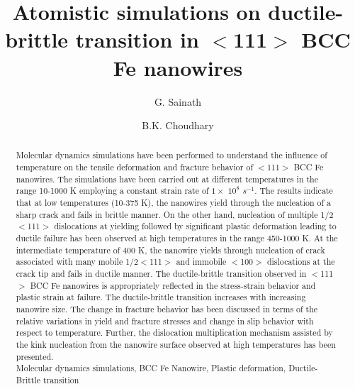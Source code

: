 \documentclass[%
reprint,%
 amssymb, amsmath,%
 aip,apl,%
]{revtex4-1}
\begin{document}
\title{ Atomistic simulations on ductile-brittle transition in  $<$111$>$ BCC Fe nanowires}

\author{G. Sainath}%

%

\author{B.K. Choudhary}




\begin{abstract}

Molecular dynamics simulations have been performed to understand the influence of temperature on the tensile deformation 
and fracture behavior of $<$111$>$ BCC Fe nanowires. The simulations have been carried out at different temperatures in 
the range 10-1000 K employing a constant strain rate of $1\times$ $10^8$ $s^{-1}$. The results indicate that at low 
temperatures (10-375 K), the nanowires yield through the nucleation of a sharp crack and fails in brittle manner. On the 
other hand, nucleation of multiple 1/2$<$111$>$ dislocations at yielding followed by significant plastic deformation 
leading to ductile failure has been observed at high temperatures in the range 450-1000 K. At the intermediate temperature 
of 400 K, the nanowire yields through nucleation of crack associated with many mobile 1/2$<$111$>$ and immobile $<$100$>$ 
dislocations at the crack tip and fails in ductile manner. The ductile-brittle transition observed in $<$111$>$ BCC Fe 
nanowires is appropriately reflected in the stress-strain behavior and plastic strain at failure. The ductile-brittle 
transition increases with increasing nanowire size. The change in fracture behavior has been discussed in terms of the 
relative variations in yield and fracture stresses and change in slip behavior with respect to temperature. Further, the 
dislocation multiplication mechanism assisted by the kink nucleation from the nanowire surface observed at high temperatures 
has been presented. \\ 

 Molecular dynamics simulations, BCC Fe Nanowire, Plastic deformation, Ductile-Brittle transition

\end{abstract}
\end{document}
